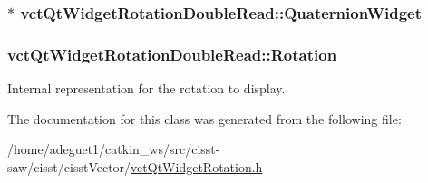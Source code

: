 \hypertarget{classvct_qt_widget_rotation_double_read_ac469ac805f4ad832983f39cb6768da6b}{
\subsubsection[{Quaternion\-Widget}]{$\ast$ vct\-Qt\-Widget\-Rotation\-Double\-Read\-::\-Quaternion\-Widget\hspace{0.3cm}{\ttfamily [protected]}}}\label{classvct_qt_widget_rotation_double_read_ac469ac805f4ad832983f39cb6768da6b}
\hypertarget{classvct_qt_widget_rotation_double_read_ab356235edf17d23d15ce8289b4ad91c9}{
\subsubsection[{Rotation}]{ vct\-Qt\-Widget\-Rotation\-Double\-Read\-::\-Rotation\hspace{0.3cm}{\ttfamily [protected]}}}\label{classvct_qt_widget_rotation_double_read_ab356235edf17d23d15ce8289b4ad91c9}
Internal representation for the rotation to display. 

The documentation for this class was generated from the following file\-:\begin{DoxyCompactItemize}
\item 
/home/adeguet1/catkin\-\_\-ws/src/cisst-\/saw/cisst/cisst\-Vector/\hyperlink{vct_qt_widget_rotation_8h}{vct\-Qt\-Widget\-Rotation.\-h}\end{DoxyCompactItemize}
